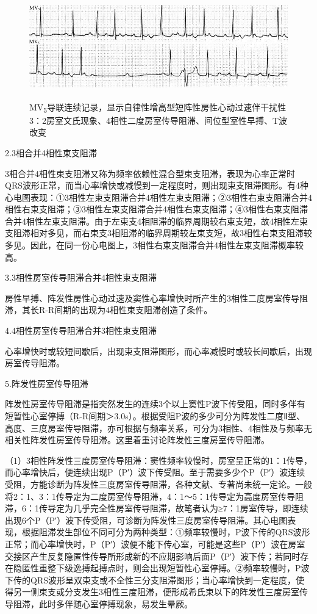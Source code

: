 \begin{figure}[!htbp]
 \centering
 \includegraphics[width=5.58333in,height=1.78125in]{./images/Image00382.jpg}
 \captionsetup{justification=centering}
 \caption{MV\textsubscript{5}导联连续记录，显示自律性增高型短阵性房性心动过速伴干扰性3：2房室文氏现象、4相性二度房室传导阻滞、间位型室性早搏、T波改变}
 \label{fig22-15}
  \end{figure} 


2.3相合并4相性束支阻滞

3相合并4相性束支阻滞又称为频率依赖性混合型束支阻滞，表现为心率正常时QRS波形正常，而当心率增快或减慢到一定程度时，则出现束支阻滞图形。有4种心电图表现：①3相性左束支阻滞合并4相性左束支阻滞；②3相性右束支阻滞合并4相性右束支阻滞；③3相性左束支阻滞合并4相性右束支阻滞；④3相性右束支阻滞合并4相性左束支阻滞。由于左束支4相阻滞的临界周期较右束支短，故4相性左束支阻滞相对多见，而右束支3相阻滞的临界周期较左束支短，故3相性右束支阻滞较多见。因此，在同一份心电图上，3相性右束支阻滞合并4相性左束支阻滞概率较高。

3.3相性房室传导阻滞合并4相性束支阻滞

房性早搏、阵发性房性心动过速及窦性心率增快时所产生的3相性二度房室传导阻滞，其长R-R间期的出现为4相性束支阻滞创造了条件。

4.4相性房室传导阻滞合并3相性束支阻滞

心率增快时或较短间歇后，出现束支阻滞图形，而心率减慢时或较长间歇后，出现房室传导阻滞。

5.阵发性房室传导阻滞

阵发性房室传导阻滞是指突然发生的连续3个以上窦性P波下传受阻，同时多伴有短暂性心室停搏（R-R间期＞3.0s）。根据受阻P波的多少可分为阵发性二度Ⅱ型、高度、三度房室传导阻滞，亦可根据与频率关系，可分为3相性、4相性及与频率无相关性阵发性房室传导阻滞。这里着重讨论阵发性三度房室传导阻滞。

（1）3相性阵发性三度房室传导阻滞：窦性频率较慢时，房室呈正常的1：1传导，而心率增快后，便连续出现P（P′）波下传受阻。至于需要多少个P（P′）波连续受阻，方能诊断为阵发性三度房室传导阻滞，各种文献、专著尚未统一定论。一般将2：1、3：1传导定为二度房室传导阻滞，4：1～5：1传导定为高度房室传导阻滞，6：1传导定为几乎完全性房室传导阻滞，故笔者认为≥7：1房室传导，即连续出现6个P（P′）波下传受阻，可诊断为阵发性三度房室传导阻滞。其心电图表现，根据阻滞发生部位不同可分为两种类型：①频率较慢时，P波下传的QRS波形正常；而心率增快时，P（P′）波便不能下传心室，可能是这些P（P′）波在房室交接区产生反复隐匿性传导所形成新的不应期影响后面P（P′）波下传；若同时存在隐匿性重整下级逸搏起搏点时，则会出现短暂性心室停搏。②频率较慢时，P波下传的QRS波形呈双束支或不全性三分支阻滞图形；当心率增快到一定程度，使得另一侧束支或分支发生3相性三度阻滞，便形成希氏束以下的阵发性三度房室传导阻滞，此时多伴随心室停搏现象，易发生晕厥。


